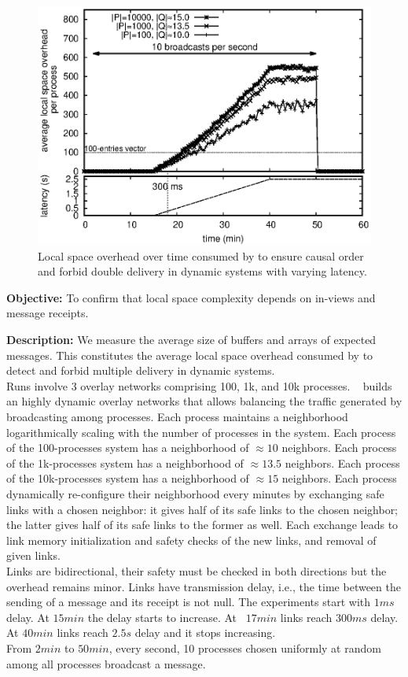 \begin{figure}
  \begin{center}
    \includegraphics[width=0.8\columnwidth]{./img/overhead.eps}
    \caption{\label{fig:overhead}Local space overhead over time consumed by
      \RPCBROADCAST to ensure causal order and forbid double delivery in dynamic
      systems with varying latency.}
  \end{center}
\end{figure}


\noindent \textbf{Objective:} To confirm that local space complexity
depends on in-views and message receipts.

\noindent \textbf{Description:} We measure the average size of buffers and
arrays of expected messages. This constitutes the average local space overhead
consumed by \RPCBROADCAST to detect and forbid multiple delivery in dynamic
systems.\\
Runs involve 3 overlay networks comprising 100, 1k, and 10k
processes. \SPRAY~\cite{nedelec2017adaptive} builds an highly dynamic overlay
networks that allows balancing the traffic generated by broadcasting among
processes. Each process maintains a neighborhood logarithmically scaling with
the number of processes in the system. Each process of the 100-processes system
has a neighborhood of $\approx 10$ neighbors. Each process of the 1k-processes
system has a neighborhood of $\approx 13.5$ neighbors. Each process of the
10k-processes system has a neighborhood of $\approx 15$ neighbors. Each process
dynamically re-configure their neighborhood every minutes by exchanging safe
links with a chosen neighbor: it gives half of its safe links to the chosen
neighbor; the latter gives half of its safe links to the former as well. Each
exchange leads to link memory initialization and safety checks of the new links,
and removal of given links.\\ Links are bidirectional, their safety must be
checked in both directions but the overhead remains minor. Links have
transmission delay, i.e., the time between the sending of a message and its
receipt is not null. The experiments start with $1ms$ delay. At $15min$ the
delay starts to increase. At ~$17min$ links reach $300ms$ delay. At $40min$
links reach $2.5s$ delay and it stops increasing.\\
From $2min$ to $50min$, every second, 10 processes chosen uniformly at random
among all processes broadcast a message.

